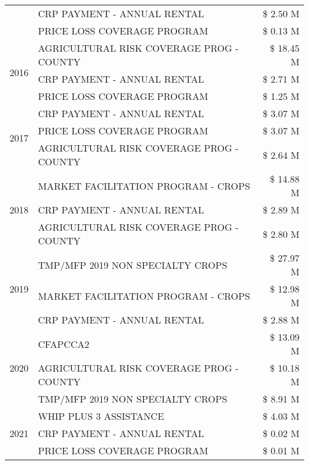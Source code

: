 \begin{tabular}{llr}
 & CRP PAYMENT - ANNUAL RENTAL & \$ 2.50 M \\
 & PRICE LOSS COVERAGE PROGRAM & \$ 0.13 M \\
\cline{1-3}
\multirow[t]{3}{*}{2016} & AGRICULTURAL RISK COVERAGE PROG - COUNTY & \$ 18.45 M \\
 & CRP PAYMENT - ANNUAL RENTAL & \$ 2.71 M \\
 & PRICE LOSS COVERAGE PROGRAM & \$ 1.25 M \\
\cline{1-3}
\multirow[t]{3}{*}{2017} & CRP PAYMENT - ANNUAL RENTAL & \$ 3.07 M \\
 & PRICE LOSS COVERAGE PROGRAM & \$ 3.07 M \\
 & AGRICULTURAL RISK COVERAGE PROG - COUNTY & \$ 2.64 M \\
\cline{1-3}
\multirow[t]{3}{*}{2018} & MARKET FACILITATION PROGRAM - CROPS & \$ 14.88 M \\
 & CRP PAYMENT - ANNUAL RENTAL & \$ 2.89 M \\
 & AGRICULTURAL RISK COVERAGE PROG - COUNTY & \$ 2.80 M \\
\cline{1-3}
\multirow[t]{3}{*}{2019} & TMP/MFP 2019 NON SPECIALTY CROPS & \$ 27.97 M \\
 & MARKET FACILITATION PROGRAM - CROPS & \$ 12.98 M \\
 & CRP PAYMENT - ANNUAL RENTAL & \$ 2.88 M \\
\cline{1-3}
\multirow[t]{3}{*}{2020} & CFAPCCA2 & \$ 13.09 M \\
 & AGRICULTURAL RISK COVERAGE PROG - COUNTY & \$ 10.18 M \\
 & TMP/MFP 2019 NON SPECIALTY CROPS & \$ 8.91 M \\
\cline{1-3}
\multirow[t]{3}{*}{2021} & WHIP PLUS 3 ASSISTANCE & \$ 4.03 M \\
 & CRP PAYMENT - ANNUAL RENTAL & \$ 0.02 M \\
 & PRICE LOSS COVERAGE PROGRAM & \$ 0.01 M \\
\cline{1-3}
\bottomrule
\end{tabular}
